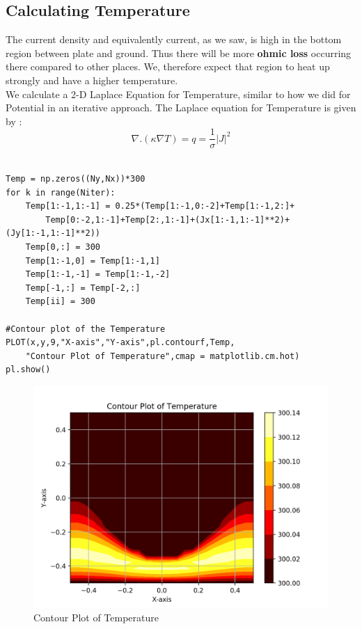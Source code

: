 \documentclass[11pt, a4paper]{article}
\begin{document}
\subsection{Calculating Temperature}
The current density and equivalently current, as we saw, is high in the bottom region between plate and ground. Thus there will be more \textbf{ohmic loss} occurring there compared to other places. We, therefore expect that region to heat up strongly and have a higher temperature.
\\
We calculate a 2-D Laplace Equation for Temperature, similar to how we did for Potential in an iterative approach. The Laplace equation for Temperature is given by :
\\
\begin{equation}\label{eq:9}
\nabla . (\kappa \nabla T) = q = \frac{1}{\sigma} |J|^2
\end{equation}
\\
\begin{verbatim}
Temp = np.zeros((Ny,Nx))*300
for k in range(Niter):
	Temp[1:-1,1:-1] = 0.25*(Temp[1:-1,0:-2]+Temp[1:-1,2:]+
		Temp[0:-2,1:-1]+Temp[2:,1:-1]+(Jx[1:-1,1:-1]**2)+(Jy[1:-1,1:-1]**2))
	Temp[0,:] = 300
	Temp[1:-1,0] = Temp[1:-1,1]
	Temp[1:-1,-1] = Temp[1:-1,-2]
	Temp[-1,:] = Temp[-2,:]
	Temp[ii] = 300
	
#Contour plot of the Temperature
PLOT(x,y,9,"X-axis","Y-axis",pl.contourf,Temp,
	"Contour Plot of Temperature",cmap = matplotlib.cm.hot)
pl.show()
\end{verbatim}
\begin{figure}[H]
   	\centering
   	\includegraphics[scale=0.5]{temp.png}
   	\caption{Contour Plot of Temperature}
   	\label{fig:temp}
\end{figure}
\end{document}
